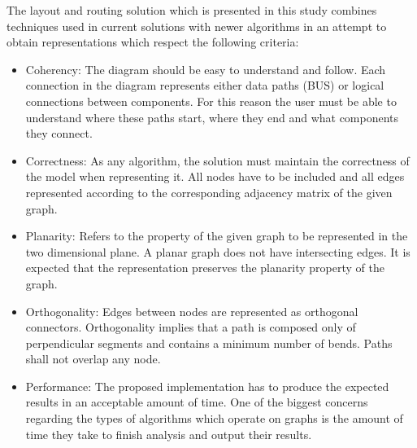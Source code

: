 The layout and routing solution which is presented in this study combines techniques used in current solutions with newer algorithms 
in an attempt to obtain representations which respect the following criteria:

\begin{itemize}

\item Coherency: The diagram should be easy to understand and follow. Each connection in the diagram represents either 
data paths (BUS) or logical connections between components. For this reason the user must be able to understand where these paths start, 
where they end and what components they connect.

\item Correctness: As any algorithm, the solution must maintain the correctness of the model when representing it. All nodes have to be
included and all edges represented according to the corresponding adjacency matrix of the given graph.

\item Planarity: Refers to the property of the given graph to be represented in the two dimensional plane. A planar graph does not have 
intersecting edges. It is expected that the representation preserves the planarity property of the graph.

\item Orthogonality: Edges between nodes are represented as orthogonal connectors. Orthogonality implies that a path is composed only
of perpendicular segments and contains a minimum number of bends. Paths shall not overlap any node.

\item Performance: The proposed implementation has to produce the expected results in an acceptable amount of time. One of the biggest 
concerns regarding the types of algorithms which operate on graphs is the amount of time they take to finish analysis and output 
their results.

\end{itemize}
